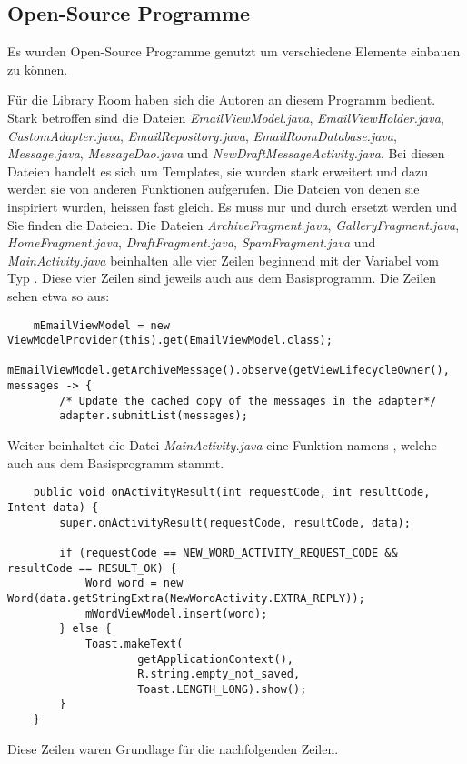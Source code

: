 \documentclass[a4paper,11pt]{article}
\begin{document}
\newpage
\begin{appendices}
\subsection*{Open-Source Programme}
Es wurden Open-Source Programme genutzt um verschiedene Elemente einbauen zu können. 

Für die Library Room haben sich die Autoren an diesem Programm bedient. \cite{roomApp}
Stark betroffen sind die Dateien \textit{EmailViewModel.java}, \textit{EmailViewHolder.java}, \textit{CustomAdapter.java}, \textit{EmailRepository.java}, \textit{EmailRoomDatabase.java}, \textit{Message.java}, \textit{MessageDao.java}
und \textit{NewDraftMessageActivity.java}. Bei diesen
Dateien handelt es sich um Templates, sie wurden stark erweitert und dazu werden sie von anderen Funktionen aufgerufen. 
Die Dateien von denen sie inspiriert wurden, heissen fast gleich. Es muss nur  und  durch  ersetzt werden und Sie finden die Dateien.
Die Dateien \textit{ArchiveFragment.java}, \textit{GalleryFragment.java}, \textit{HomeFragment.java}, \textit{DraftFragment.java}, \textit{SpamFragment.java} und \textit{MainActivity.java} beinhalten alle vier Zeilen beginnend mit der 
Variabel  vom Typ . Diese vier Zeilen sind jeweils auch aus dem Basisprogramm. 
Die Zeilen sehen etwa so aus:
\lstset{language=java}
\begin{lstlisting}
    mEmailViewModel = new ViewModelProvider(this).get(EmailViewModel.class);
    mEmailViewModel.getArchiveMessage().observe(getViewLifecycleOwner(), messages -> {
        /* Update the cached copy of the messages in the adapter*/
        adapter.submitList(messages);

\end{lstlisting}


Weiter beinhaltet die Datei \textit{MainActivity.java} eine Funktion namens , welche auch aus dem Basisprogramm stammt. 
    \lstset{language=java}
    \begin{lstlisting}
    public void onActivityResult(int requestCode, int resultCode, Intent data) {
        super.onActivityResult(requestCode, resultCode, data);

        if (requestCode == NEW_WORD_ACTIVITY_REQUEST_CODE && resultCode == RESULT_OK) {
            Word word = new Word(data.getStringExtra(NewWordActivity.EXTRA_REPLY));
            mWordViewModel.insert(word);
        } else {
            Toast.makeText(
                    getApplicationContext(),
                    R.string.empty_not_saved,
                    Toast.LENGTH_LONG).show();
        }
    }
    \end{lstlisting}
Diese Zeilen waren Grundlage für die nachfolgenden Zeilen.


\end{appendices}
\end{document}

